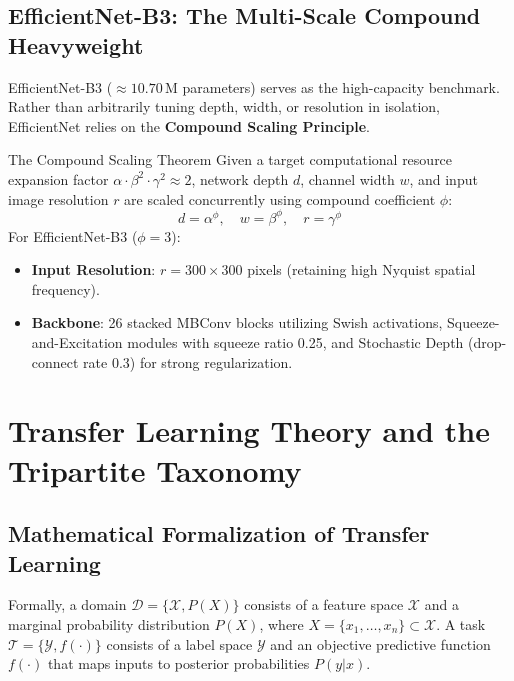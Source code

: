 \documentclass[11pt,a4paper]{article}
\begin{document}
\subsection{EfficientNet-B3: The Multi-Scale Compound Heavyweight}
EfficientNet-B3 ($\approx 10.70$\,M parameters) serves as the high-capacity benchmark. Rather than arbitrarily tuning depth, width, or resolution in isolation, EfficientNet relies on the \textbf{Compound Scaling Principle}.

\begin{highlightbox}{The Compound Scaling Theorem}
Given a target computational resource expansion factor $\alpha \cdot \beta^2 \cdot \gamma^2 \approx 2$, network depth $d$, channel width $w$, and input image resolution $r$ are scaled concurrently using compound coefficient $\phi$:
\begin{equation}
    d = \alpha^\phi, \quad w = \beta^\phi, \quad r = \gamma^\phi
\end{equation}
For EfficientNet-B3 ($\phi = 3$):
\begin{itemize}
    \item \textbf{Input Resolution}: $r = 300 \times 300$ pixels (retaining high Nyquist spatial frequency).
    \item \textbf{Backbone}: 26 stacked MBConv blocks utilizing Swish activations, Squeeze-and-Excitation modules with squeeze ratio 0.25, and Stochastic Depth (drop-connect rate 0.3) for strong regularization.
\end{itemize}
\end{highlightbox}

\section{Transfer Learning Theory and the Tripartite Taxonomy}

\subsection{Mathematical Formalization of Transfer Learning}
Formally, a domain $\mathcal{D} = \{\mathcal{X}, P(X)\}$ consists of a feature space $\mathcal{X}$ and a marginal probability distribution $P(X)$, where $X = \{x_1, \dots, x_n\} \subset \mathcal{X}$. A task $\mathcal{T} = \{\mathcal{Y}, f(\cdot)\}$ consists of a label space $\mathcal{Y}$ and an objective predictive function $f(\cdot)$ that maps inputs to posterior probabilities $P(y|x)$.
\end{document}
